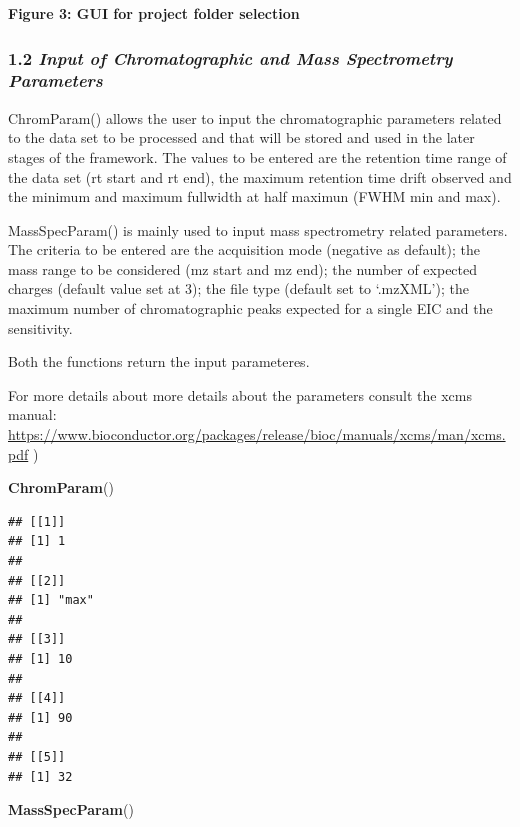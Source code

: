 \documentclass[
]{article}
\newenvironment{Shaded}{\begin{snugshade}}{\end{snugshade}}
\newcommand{\KeywordTok}[1]{\textcolor[rgb]{0.13,0.29,0.53}{\textbf{#1}}}
\newcommand{\NormalTok}[1]{#1}
\begin{document}
\textbf{Figure 3: GUI for project folder selection}

\hypertarget{input-of-chromatographic-and-mass-spectrometry-parameters}{%
\subsubsection{\texorpdfstring{1.2 \emph{Input of Chromatographic and
Mass Spectrometry
Parameters}}{1.2 Input of Chromatographic and Mass Spectrometry Parameters}}\label{input-of-chromatographic-and-mass-spectrometry-parameters}}

ChromParam() allows the user to input the chromatographic parameters
related to the data set to be processed and that will be stored and used
in the later stages of the framework. The values to be entered are the
retention time range of the data set (rt start and rt end), the maximum
retention time drift observed and the minimum and maximum fullwidth at
half maximun (FWHM min and max).

MassSpecParam() is mainly used to input mass spectrometry related
parameters. The criteria to be entered are the acquisition mode
(negative as default); the mass range to be considered (mz start and mz
end); the number of expected charges (default value set at 3); the file
type (default set to `.mzXML'); the maximum number of chromatographic
peaks expected for a single EIC and the sensitivity.

Both the functions return the input parameteres.

For more details about more details about the parameters consult the
xcms manual:
\url{https://www.bioconductor.org/packages/release/bioc/manuals/xcms/man/xcms.pdf}
)

\begin{Shaded}
\begin{Highlighting}[]
\KeywordTok{ChromParam}\NormalTok{()}
\end{Highlighting}
\end{Shaded}

\begin{verbatim}
## [[1]]
## [1] 1
## 
## [[2]]
## [1] "max"
## 
## [[3]]
## [1] 10
## 
## [[4]]
## [1] 90
## 
## [[5]]
## [1] 32
\end{verbatim}

\begin{Shaded}
\begin{Highlighting}[]
\KeywordTok{MassSpecParam}\NormalTok{()}
\end{Highlighting}
\end{Shaded}
\end{document}
